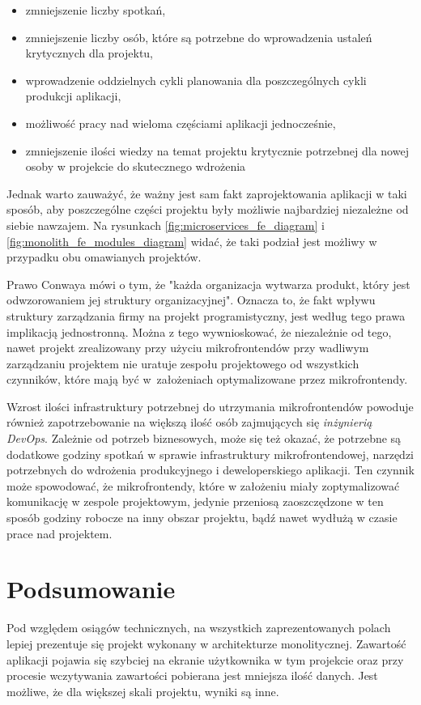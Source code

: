 \documentclass{SGGW-thesis}
\begin{document}
  \begin{itemize}
    \item zmniejszenie liczby spotkań,
    \item zmniejszenie liczby osób, które są potrzebne do wprowadzenia ustaleń krytycznych dla projektu,
    \item wprowadzenie oddzielnych cykli planowania dla poszczególnych cykli produkcji aplikacji,
    \item możliwość pracy nad wieloma częściami aplikacji jednocześnie,
    \item zmniejszenie ilości wiedzy na temat projektu krytycznie potrzebnej dla nowej osoby w projekcie do skutecznego wdrożenia
  \end{itemize}  

  Jednak warto zauważyć, że ważny jest sam fakt zaprojektowania aplikacji w taki sposób, aby poszczególne części projektu były możliwie najbardziej niezależne od siebie nawzajem. Na rysunkach \cref{fig:microservices_fe_diagram} i \cref{fig:monolith_fe_modules_diagram} widać, że taki podział jest możliwy w przypadku obu omawianych projektów.

  Prawo Conwaya \cite{conway} mówi o tym, że "każda organizacja wytwarza produkt, który jest odwzorowaniem jej struktury organizacyjnej". Oznacza to, że fakt wpływu struktury zarządzania firmy na projekt programistyczny, jest według tego prawa implikacją jednostronną. Można z tego wywnioskować, że niezależnie od tego, nawet projekt zrealizowany przy użyciu mikrofrontendów przy wadliwym zarządzaniu projektem nie uratuje zespołu projektowego od wszystkich czynników, które mają być w~założeniach optymalizowane przez mikrofrontendy.

  Wzrost ilości infrastruktury potrzebnej do utrzymania mikrofrontendów powoduje również zapotrzebowanie na większą ilość osób zajmujących się \textit{inżynierią DevOps}. Zależnie od potrzeb biznesowych, może się też okazać, że potrzebne są dodatkowe godziny spotkań w sprawie infrastruktury mikrofrontendowej, narzędzi potrzebnych do wdrożenia produkcyjnego i deweloperskiego aplikacji. Ten czynnik może spowodować, że mikrofrontendy, które w założeniu miały zoptymalizować komunikację w zespole projektowym, jedynie przeniosą zaoszczędzone w ten sposób godziny robocze na inny obszar projektu, bądź nawet wydłużą w czasie prace nad projektem.

\chapter{Podsumowanie}
Pod względem osiągów technicznych, na wszystkich zaprezentowanych polach lepiej prezentuje się projekt wykonany w architekturze monolitycznej. Zawartość aplikacji pojawia się szybciej na ekranie użytkownika w tym projekcie oraz przy procesie wczytywania zawartości pobierana jest mniejsza ilość danych. Jest możliwe, że dla większej skali projektu, wyniki są inne.
\end{document}
